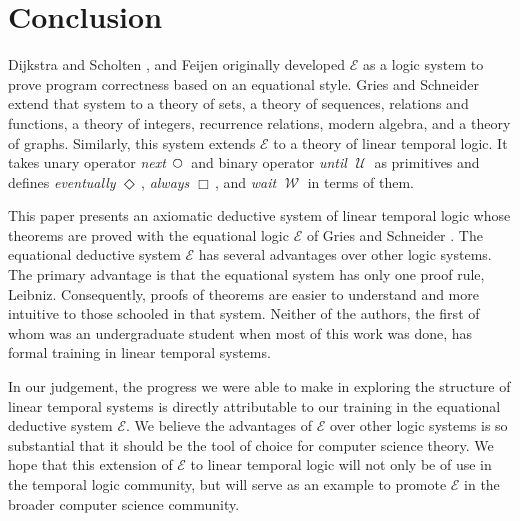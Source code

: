 \documentclass[12pt, fleqn, leqno]{article}
\newcommand{\Until}{\;\mathcal{U}\;}
\newcommand{\Wait}{\;\mathcal{W}\;}
\newcommand{\Next}{\;\,\text{\raisebox{3.5pt}{\circle{6}}}}
\newcommand{\Event}{\Diamond\,}
\newcommand{\Always}{\Box\,}
\begin{document}
\section{Conclusion}

Dijkstra and Scholten \cite{DandS}, and Feijen \cite{Feij} originally developed $\mathcal{E}$ as a logic system to prove
program correctness based on an equational style.
Gries and Schneider extend that system to a theory of sets, a theory of sequences,
relations and functions, a theory of integers, recurrence relations, modern algebra, and a theory of graphs.
Similarly, this system extends $\mathcal{E}$ to a theory of linear temporal logic.
It takes unary operator \textit{next} $\Next$ and binary operator \textit{until} $\Until$ as primitives and defines
\textit{eventually} $\Event$, \textit{always} $\Always$, and \textit{wait} $\Wait$ in terms of them.

This paper presents an axiomatic deductive system of linear temporal logic whose theorems are proved with the equational
logic $\mathcal{E}$ of Gries and Schneider \cite{LADM}.
The equational deductive system $\mathcal{E}$ has several advantages over other logic systems.
The primary advantage is that the equational system has only one proof rule, Leibniz.
Consequently, proofs of theorems are easier to understand and more intuitive to those schooled in that system.
Neither of the authors, the first of whom was an undergraduate student when most of this work was done,
has formal training in linear temporal systems.

In our judgement, the progress we were able to make in exploring the structure of linear temporal systems
is directly attributable to our training in the equational deductive system $\mathcal{E}$.
We believe the advantages of $\mathcal{E}$ over other logic systems is so substantial that it should be the
tool of choice for computer science theory.
We hope that this extension of $\mathcal{E}$ to linear temporal logic will not only be of use in the
temporal logic community, but will serve as an example to promote $\mathcal{E}$ in the broader computer science community.



\end{document}
